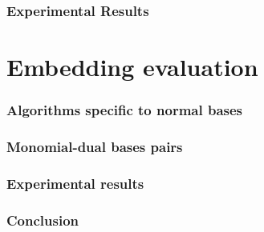 \documentclass[12pt]{article}
\theoremstyle{plain}
\theoremstyle{definition}
\begin{document}
\section{Experimental Results}


\part{Embedding evaluation}


\section{Algorithms specific to normal bases}


\section{Monomial-dual bases pairs}


\section{Experimental results}


\section{Conclusion}




\end{document}
